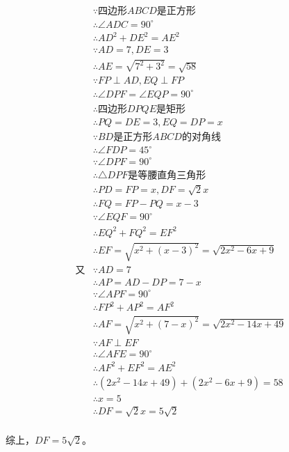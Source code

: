 \begin{align*}
  &\because   \text{四边形}ABCD\text{是正方形} \\
  &\therefore \angle ADC = 90^\circ \\
  &\therefore AD^2 + DE^2 = AE^2 \\
  &\because   AD = 7, DE = 3 \\
  &\therefore AE = \sqrt{7^2 + 3^2} = \sqrt{58} \\
  &\because   FP \perp AD, EQ \perp FP \\
  &\therefore \angle DPF = \angle EQP = 90^\circ \\
  &\therefore \text{四边形}DPQE\text{是矩形} \\
  &\therefore PQ = DE = 3, EQ = DP = x \\
  &\because   BD\text{是正方形}ABCD\text{的对角线} \\
  &\therefore \angle FDP = 45^\circ \\
  &\because   \angle DPF = 90^\circ \\
  &\therefore \triangle DPF\text{是等腰直角三角形} \\
  &\therefore PD = FP = x, DF = \sqrt2x \\
  &\therefore FQ = FP - PQ = x - 3 \\
  &\because   \angle EQF = 90^\circ \\
  &\therefore EQ^2 + FQ^2 = EF^2 \\
  &\therefore EF = \sqrt{x^2 + (x - 3)^2} = \sqrt{2x^2 - 6x + 9} \\
  \text{又}&\because AD = 7 \\
  &\therefore AP = AD - DP = 7 - x \\
  &\because   \angle APF = 90^\circ \\
  &\therefore FP^2 + AP^2 = AF^2 \\
  &\therefore AF = \sqrt{x^2 + (7 - x)^2} = \sqrt{2x^2 - 14x + 49} \\
  &\because   AF \perp EF \\
  &\therefore \angle AFE = 90^\circ \\
  &\therefore AF^2 + EF^2 = AE^2 \\
  &\therefore (2x^2 - 14x + 49) + (2x^2 - 6x + 9) = 58 \\
  &\therefore x = 5 \\
  &\therefore DF = \sqrt2x = 5\sqrt2 \\
\end{align*}

综上，$DF = 5\sqrt2$。

